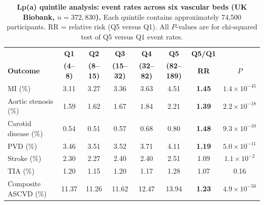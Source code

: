 \documentclass[11pt,a4paper]{article}
\begin{document}
\begin{table}[H]
\centering
\caption{\textbf{Lp(a) quintile analysis: event rates across six vascular beds (UK Biobank, $n = 372{,}830$).} Each quintile contains approximately 74{,}500 participants. RR = relative risk (Q5 versus Q1). All $P$-values are for chi-squared test of Q5 versus Q1 event rates.}
\label{tab:quintiles}
\small
\begin{tabular}{@{}lccccccc@{}}
\toprule
& \textbf{Q1} & \textbf{Q2} & \textbf{Q3} & \textbf{Q4} & \textbf{Q5} & \textbf{Q5/Q1} & \\
\textbf{Outcome} & \textbf{(4--8)} & \textbf{(8--15)} & \textbf{(15--32)} & \textbf{(32--82)} & \textbf{(82--189)} & \textbf{RR} & \textbf{$P$} \\
\midrule
MI (\%) & 3.11 & 3.27 & 3.36 & 3.63 & 4.51 & \textbf{1.45} & $1.4 \times 10^{-45}$ \\
Aortic stenosis (\%) & 1.59 & 1.62 & 1.67 & 1.84 & 2.21 & \textbf{1.39} & $2.2 \times 10^{-18}$ \\
Carotid disease (\%) & 0.54 & 0.51 & 0.57 & 0.68 & 0.80 & \textbf{1.48} & $9.3 \times 10^{-10}$ \\
PVD (\%) & 3.46 & 3.51 & 3.52 & 3.71 & 4.11 & \textbf{1.19} & $5.0 \times 10^{-11}$ \\
Stroke (\%) & 2.30 & 2.27 & 2.40 & 2.40 & 2.51 & 1.09 & $1.1 \times 10^{-2}$ \\
TIA (\%) & 1.20 & 1.15 & 1.20 & 1.17 & 1.28 & 1.07 & 0.16 \\
\midrule
Composite ASCVD (\%) & 11.37 & 11.26 & 11.62 & 12.47 & 13.94 & \textbf{1.23} & $4.9 \times 10^{-50}$ \\
\bottomrule
\end{tabular}
\end{table}
\end{document}
